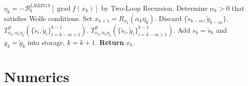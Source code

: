 \documentclass[9pt]{beamer}
\begin{document}
\begin{frame}
    \begin{algorithm}[H]
        \begin{algorithmic}[1]
            \State $\eta_k = - \mathcal{B}^{LRBFGS}_k [\operatorname{grad} f(x_k)]$ by Two-Loop Recursion.
            \State Determine $\alpha_k > 0$ that satisfies Wolfe conditions. 
            \State Set $x_{k+1} = R_{x_k}(\alpha_k \eta_k)$.
                \State Discard $\{ \widetilde{s}_{k-m}, \widetilde{y}_{k-m}\}$, $T^{S}_{x_k, \alpha_k \eta_k} (\{ \widetilde{s}_i, \widetilde{y}_i\}_{i=k-m+1}^{k-1})$.
			\Else 
				\State $T^{S}_{x_k, \alpha_k \eta_k} (\{ \widetilde{s}_i, \widetilde{y}_i\}_{i=k-m+1}^{k-1})$.
            \EndIf 
            \State Add $s_k = \widetilde{s}_k$ and $y_k = \widetilde{y}_k$ into storage.
            \State $k = k+1$.
        \EndWhile
        \State \textbf{Return} $x_k$.
        \end{algorithmic}
    \end{algorithm}
\end{frame}

\section{Numerics}
\end{document}

